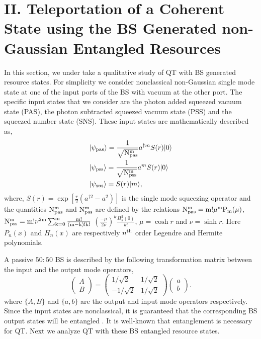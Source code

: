 \documentclass[letter,scriptaddress,twocolumn, prl,showkeys]{revtex4}
\begin{document}
\section*{II. Teleportation of a Coherent State using the BS Generated non-Gaussian Entangled Resources}

In this section, we under take a qualitative study of QT with BS generated resource states.
For simplicity we consider nonclassical non-Gaussian single mode state at one of the input ports of the BS with vacuum at the other port.
The specific input states that we consider are the photon added squeezed vacuum state (PAS), the photon subtracted squeezed vacuum state (PSS) and the squeezed number state (SNS). 
These input states are mathematically described as,
\begin{subequations}
\label{psi_single}
\begin{align}
&|\psi_{\rm{pas}}\rangle =\frac{1}{\sqrt{\rm{N^{m}_{pas}}}} a^{\dagger m}S(r)|0\rangle \\
&|\psi_{\rm{pss}}\rangle =\frac{1}{\sqrt{\rm{N^{m}_{pss}}}} a^{m}S(r)|0\rangle \\
&|\psi_{\rm{sns}}\rangle =S(r)|m\rangle,
\end{align}
\end{subequations}
where, $S(r)=\exp[\frac{r}{2}(a^{\dagger 2}-a^{2})]$ is the single mode squeezing operator and the quantities $\rm{N^{m}_{pas}}$ and $\rm{N^{m}_{pss}}$ are defined by the relations $\rm{N^{m}_{pas}}=m!\mu^{m}P_{m}(\mu)$, $\rm{N^{m}_{pss}}=m!\nu^{2m}\sum_{k=0}^{m} \frac{m!}{(m-k)! k!}$ $(\frac{-\mu}{2\nu})^{k}\frac{H_{k}^{2}(0)}{k!}$, $\mu=\cosh r$ and $\nu=\sinh r$. 
Here $P_{n}(x)$ and $H_{n}(x)$ are respectively $n^{\rm{th}}$ order Legendre and Hermite polynomials.

A passive $50:50$ BS is described by the following transformation matrix between the input and the output mode operators,
\begin{equation}
\begin{pmatrix}
A \\
B
\end{pmatrix}=
\begin{pmatrix}
1/\sqrt{2} & 1/\sqrt{2}\\
-1/\sqrt{2} & 1/\sqrt{2}
\end{pmatrix}
\begin{pmatrix}
a \\
b
\end{pmatrix} .
\label{bs_trans}
\end{equation}
where $\lbrace A,B\rbrace$ and $\lbrace a,b\rbrace$ are the output and input mode operators respectively.
Since the input states are nonclassical, it is guaranteed that the corresponding BS output states will be entangled \cite{nc_bsent}.
It is well-known that entanglement is necessary for QT.
Next we analyze QT with these BS entangled resource states.
\end{document}
